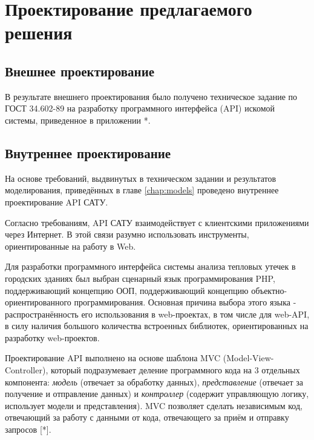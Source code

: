 \chapter{Проектирование предлагаемого решения}

\section{Внешнее проектирование}

\par
	В результате внешнего проектирования было получено техническое задание по ГОСТ 34.602-89 на разработку программного интерфейса (API) искомой системы, приведенное в приложении *.

\section{Внутреннее проектирование}

\par

	На основе требований, выдвинутых в техническом задании и результатов моделирования, приведённых в главе \ref{chap:models} проведено внутреннее проектирование API САТУ.

	Согласно требованиям, API САТУ взаимодействует с клиентскими приложениями через Интернет. В этой связи разумно использовать инструменты, ориентированные на работу в Web.

	Для разработки программного интерфейса системы анализа тепловых утечек в городских зданиях был выбран сценарный язык программирования PHP, поддерживающий концепцию ООП, поддерживающий концепцию объектно-ориентированного программирования. Основная причина выбора этого языка - распространённость его использования в web-проектах, в том числе для web-API, в силу наличия большого количества встроенных библиотек, ориентированных на разработку web-проектов.


\par

	Проектирование API выполнено на основе шаблона {MVC (Model-View-Controller)}, который подразумевает деление программного кода на 3 отдельных компонента: \textit{модель} (отвечает за обработку данных), \textit{представление} (отвечает за получение и отправление данных) и \textit{контроллер} (содержит управляющую логику, использует модели и представления). MVC позволяет сделать независимым код, отвечающий за работу с данными от кода, отвечающего за приём и отправку запросов [*].
	
